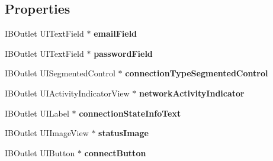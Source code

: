 \subsection*{Properties}
\begin{DoxyCompactItemize}
\item 
\hypertarget{interface_m_d_i_o_s_settings_view_controller_ae898c1f788fc33721549feca2473541e}{I\-B\-Outlet U\-I\-Text\-Field $\ast$ {\bfseries email\-Field}}\label{interface_m_d_i_o_s_settings_view_controller_ae898c1f788fc33721549feca2473541e}

\item 
\hypertarget{interface_m_d_i_o_s_settings_view_controller_a612578206c49410e39072b068875d5a6}{I\-B\-Outlet U\-I\-Text\-Field $\ast$ {\bfseries password\-Field}}\label{interface_m_d_i_o_s_settings_view_controller_a612578206c49410e39072b068875d5a6}

\item 
\hypertarget{interface_m_d_i_o_s_settings_view_controller_acc5b5eef8c9934e3d371858b2e1c4f90}{I\-B\-Outlet U\-I\-Segmented\-Control $\ast$ {\bfseries connection\-Type\-Segmented\-Control}}\label{interface_m_d_i_o_s_settings_view_controller_acc5b5eef8c9934e3d371858b2e1c4f90}

\item 
\hypertarget{interface_m_d_i_o_s_settings_view_controller_a8042a3d7d8273ca5f93937719c966732}{I\-B\-Outlet U\-I\-Activity\-Indicator\-View $\ast$ {\bfseries network\-Activity\-Indicator}}\label{interface_m_d_i_o_s_settings_view_controller_a8042a3d7d8273ca5f93937719c966732}

\item 
\hypertarget{interface_m_d_i_o_s_settings_view_controller_a71c3897f5b971ea004df9a2b1a499287}{I\-B\-Outlet U\-I\-Label $\ast$ {\bfseries connection\-State\-Info\-Text}}\label{interface_m_d_i_o_s_settings_view_controller_a71c3897f5b971ea004df9a2b1a499287}

\item 
\hypertarget{interface_m_d_i_o_s_settings_view_controller_a78a1ed387abf8ae41bc8df4f3ec1eb8a}{I\-B\-Outlet U\-I\-Image\-View $\ast$ {\bfseries status\-Image}}\label{interface_m_d_i_o_s_settings_view_controller_a78a1ed387abf8ae41bc8df4f3ec1eb8a}

\item 
\hypertarget{interface_m_d_i_o_s_settings_view_controller_a012192416ebb0bb6d5ed9bec46611b66}{I\-B\-Outlet U\-I\-Button $\ast$ {\bfseries connect\-Button}}\label{interface_m_d_i_o_s_settings_view_controller_a012192416ebb0bb6d5ed9bec46611b66}


\end{DoxyCompactItemize}
